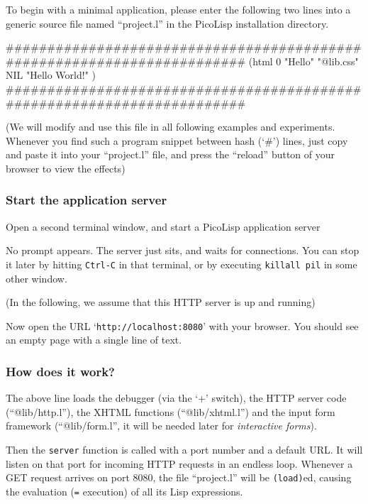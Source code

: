 To begin with a minimal application, please enter the following two
lines into a generic source file named ``project.l'' in the PicoLisp
installation directory.


\begin{wideverbatim}
########################################################################
(html 0 "Hello" "@lib.css" NIL
   "Hello World!" )
########################################################################
\end{wideverbatim}

(We will modify and use this file in all following examples and
experiments. Whenever you find such a program snippet between hash (`\#')
lines, just copy and paste it into your ``project.l'' file, and press the
``reload'' button of your browser to view the effects)

 
\subsubsection{ Start the application server}
\label{sec:appl-devel-start-the-application-server}%
Open a second terminal window, and start a PicoLisp application server



No prompt appears. The server just sits, and waits for connections. You
can stop it later by hitting \texttt{Ctrl-C} in that terminal, or by executing
 \texttt{killall pil}  in some other window.

(In the following, we assume that this HTTP server is up and running)

Now open the URL `\texttt{http://localhost:8080}' with your browser. You should
see an empty page with a single line of text.


\subsubsection{ How does it work?}
\label{sec:appl-devel-how-does-it-work?}%
The above line loads the debugger (via the `+' switch), the HTTP server
code (``@lib/http.l''), the XHTML functions (``@lib/xhtml.l'') and the input
form framework (``@lib/form.l'', it will be needed later for
\emph{interactive forms}).

Then the \texttt{server} function is called with a port number and a
default URL. It will listen on that port for incoming HTTP requests in
an endless loop. Whenever a GET request arrives on port 8080, the file
``project.l'' will be \texttt{(load)}ed, causing the evaluation
(\texttt{=} execution) of all its Lisp expressions.

